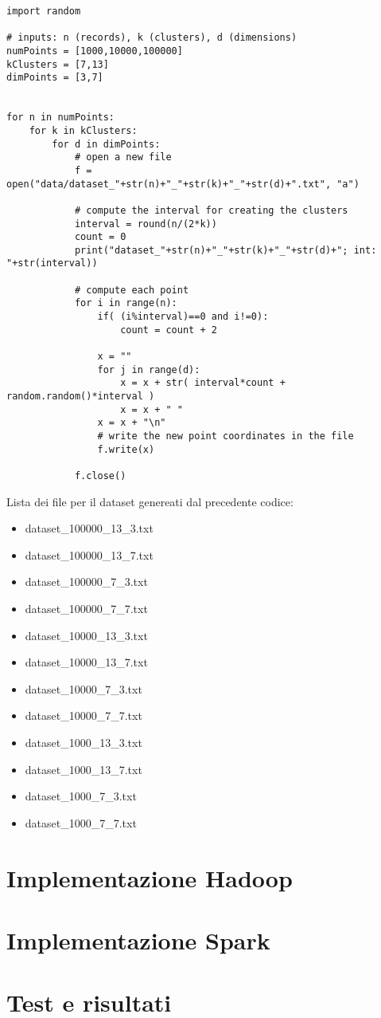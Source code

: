 \documentclass[a4paper, oneside]{article}
\begin{document}
\begin{verbatim}
import random

# inputs: n (records), k (clusters), d (dimensions)
numPoints = [1000,10000,100000]
kClusters = [7,13]
dimPoints = [3,7]


for n in numPoints:
    for k in kClusters:
        for d in dimPoints:
            # open a new file
            f = open("data/dataset_"+str(n)+"_"+str(k)+"_"+str(d)+".txt", "a")
            
            # compute the interval for creating the clusters
            interval = round(n/(2*k))
            count = 0
            print("dataset_"+str(n)+"_"+str(k)+"_"+str(d)+"; int: "+str(interval))
            
            # compute each point
            for i in range(n):
                if( (i%interval)==0 and i!=0):
                    count = count + 2
                
                x = ""
                for j in range(d):
                    x = x + str( interval*count + random.random()*interval )
                    x = x + " "
                x = x + "\n"
                # write the new point coordinates in the file
                f.write(x)
            
            f.close()
\end{verbatim}

\vspace{4mm}
Lista dei file per il dataset genereati dal precedente codice:
\begin{itemize}
\item dataset\_100000\_13\_3.txt
\item dataset\_100000\_13\_7.txt
\item dataset\_100000\_7\_3.txt
\item dataset\_100000\_7\_7.txt
\item dataset\_10000\_13\_3.txt
\item dataset\_10000\_13\_7.txt
\item dataset\_10000\_7\_3.txt
\item dataset\_10000\_7\_7.txt
\item dataset\_1000\_13\_3.txt
\item dataset\_1000\_13\_7.txt
\item dataset\_1000\_7\_3.txt
\item dataset\_1000\_7\_7.txt 
\end{itemize}

\section{Implementazione Hadoop}
\section{Implementazione Spark}
\section{Test e risultati}
\end{document}
